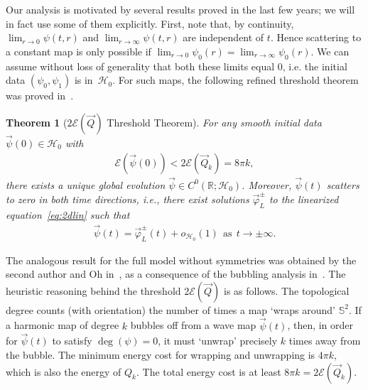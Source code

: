 \documentclass[10pt,reqno]{amsart}
\newcommand{\E}{\mathcal{E}}
\newcommand{\HH}{\mathcal{H}}
\newcommand{\R}{\mathbb{R}}
\newcommand{\Sp}{\mathbb{S}}
\newcommand{\de}{\delta}
\newcommand{\fy}{\varphi}
\newcommand{\EQ}[1]{\begin{equation}\begin{split} #1 \end{split}\end{equation}}
\numberwithin{equation}{section}
\newtheorem{thm}{Theorem}[section]
\theoremstyle{remark}
\newcommand{\mas}{{\ \ \text{as} \ \ }}
\newcommand{\0}{\emptyset}
\begin{document}
Our analysis is motivated by several results proved in the last few years; we will in fact use some of them explicitly. First, note that, by continuity, $\lim_{r\to 0}\psi(t, r)$ and $\lim_{r\to\infty}\psi(t, r)$ are independent of $t$. Hence scattering to a constant map is only possible if $\lim_{r\to 0}\psi_0(r) = \lim_{r\to\infty}\psi_0(r)$. We can assume without loss of generality
that both these limits equal $0$, i.e. the initial data $(\psi_0, \psi_1)$ is in~$\HH_0$. For such maps, the following refined threshold theorem was proved in~\cite{CKLS1}. 

\begin{thm}[$2\E(\vec Q)$ Threshold Theorem] \emph{\cite[Theorem $1.1$]{CKLS1}\label{t:2EQ}}  For any smooth initial data $\vec\psi(0) \in \HH_0$ with 
\EQ{
\E(\vec\psi(0)) < 2\E(\vec Q_k) = 8 \pi k, 
}
there exists a unique global evolution $\vec \psi \in C^0(\R; \HH_0)$. Moreover, $\vec\psi(t)$ scatters to zero in  both time directions, i.e.,  there exist solutions $\vec \fy_L^\pm$ to the linearized equation~\eqref{eq:2dlin} such that %
\EQ{ \label{scat}
 \vec{\psi}(t) = \vec \fy_L^\pm(t) + o_{\HH_0}(1) \mas t \to  \pm\infty. 
}
\end{thm}
The analogous result for the full model without symmetries was obtained by the second author and Oh in~\cite{LO1}, as a consequence of the bubbling analysis in~\cite{ST2}. 
The heuristic reasoning behind the threshold $2 \E(\vec Q)$ is as follows. The topological degree counts (with orientation) the number of times a map `wraps around' $\Sp^2$. If a harmonic map of degree $k$ bubbles off from a wave map $\vec \psi(t)$,  then, in order for $\vec \psi(t)$ to satisfy $\deg(\psi) = 0$, it must `unwrap' precisely $k$ times away from the bubble. The minimum energy cost for wrapping and unwrapping is $4 \pi k$, which is also the energy of $Q_k$. The total energy cost is at least $8 \pi k   = 2\E(\vec Q_k)$. %
\end{document}
